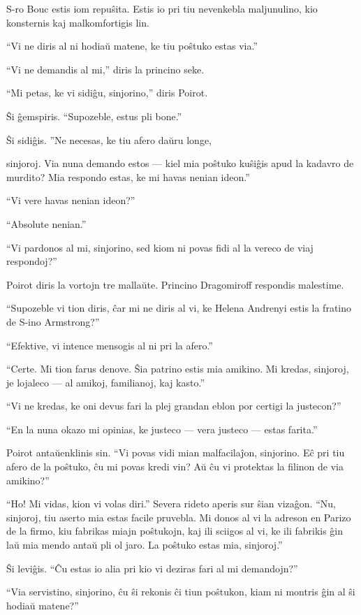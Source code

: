 S-ro Bouc estis iom repuŝita. Estis io pri tiu nevenkebla maljunulino, kio konsternis kaj malkomfortigis lin.

``Vi ne diris al ni hodiaŭ matene, ke tiu poŝtuko estas via.''

``Vi ne demandis al mi,'' diris la princino seke.

``Mi petas, ke vi sidiĝu, sinjorino,'' diris Poirot.

Ŝi ĝemspiris. ``Supozeble, estus pli bone.''

Ŝi sidiĝis. ''Ne necesas, ke tiu afero daŭru longe,

sinjoroj. Via nuna demando estos --- kiel mia poŝtuko kuŝiĝis apud la kadavro de murdito? Mia respondo estas, ke mi havas nenian ideon.''

``Vi vere havas nenian ideon?''

``Absolute nenian.''

``Vi pardonos al mi, sinjorino, sed kiom ni povas fidi al la vereco de viaj respondoj?''

Poirot diris la vortojn tre mallaŭte. Princino Dragomiroff respondis malestime.

``Supozeble vi tion diris, ĉar mi ne diris al vi, ke Helena Andrenyi estis la fratino de S-ino Armstrong?''

``Efektive, vi intence mensogis al ni pri la afero.''

``Certe. Mi tion farus denove. Ŝia patrino estis mia amikino. Mi kredas, sinjoroj, je lojaleco --- al amikoj, familianoj, kaj kasto.''

``Vi ne kredas, ke oni devus fari la plej grandan eblon por certigi la justecon?''

``En la nuna okazo mi opinias, ke justeco --- vera justeco --- estas farita.''

Poirot antaŭenklinis sin. ``Vi povas vidi mian malfacilaĵon, sinjorino. Eĉ pri tiu afero de la poŝtuko, ĉu mi povas kredi vin? Aŭ ĉu vi protektas la filinon de via amikino?''

``Ho! Mi vidas, kion vi volas diri.'' Severa rideto aperis sur ŝian vizaĝon. ``Nu, sinjoroj, tiu aserto mia estas facile pruvebla. Mi donos al vi la adreson en Parizo de la firmo, kiu fabrikas miajn poŝtukojn, kaj ili sciigos al vi, ke ili fabrikis ĝin laŭ mia mendo antaŭ pli ol jaro. La poŝtuko estas mia, sinjoroj.''

Ŝi leviĝis. ``Ĉu estas io alia pri kio vi deziras fari al mi demandojn?''

``Via servistino, sinjorino, ĉu ŝi rekonis ĉi tiun poŝtukon, kiam ni montris ĝin al ŝi hodiaŭ matene?''

